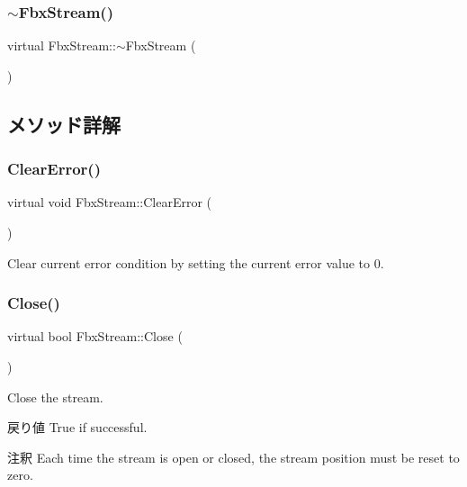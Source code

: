 \subsubsection{\texorpdfstring{$\sim$\+Fbx\+Stream()}{~FbxStream()}}
{\footnotesize\ttfamily virtual Fbx\+Stream\+::$\sim$\+Fbx\+Stream (\begin{DoxyParamCaption}{ }\end{DoxyParamCaption})\hspace{0.3cm}{\ttfamily [virtual]}}



\subsection{メソッド詳解}
\mbox{\label{class_fbx_stream_ad90dfab257677bb8cd62efb9d65d3a02}} 
\subsubsection{\texorpdfstring{Clear\+Error()}{ClearError()}}
{\footnotesize\ttfamily virtual void Fbx\+Stream\+::\+Clear\+Error (\begin{DoxyParamCaption}{ }\end{DoxyParamCaption})\hspace{0.3cm}{\ttfamily [pure virtual]}}

Clear current error condition by setting the current error value to 0. \mbox{\label{class_fbx_stream_a6779ab0ccbe8e14e5cf5cf47f5206519}} 
\subsubsection{\texorpdfstring{Close()}{Close()}}
{\footnotesize\ttfamily virtual bool Fbx\+Stream\+::\+Close (\begin{DoxyParamCaption}{ }\end{DoxyParamCaption})\hspace{0.3cm}{\ttfamily [pure virtual]}}

Close the stream. \begin{DoxyReturn}{戻り値}
True if successful. 
\end{DoxyReturn}
\begin{DoxyRemark}{注釈}
Each time the stream is open or closed, the stream position must be reset to zero. 
\end{DoxyRemark}
\mbox{\label{class_fbx_stream_a9174d1c9a10e7f0f6f283c6b7f9a1dce}} 
